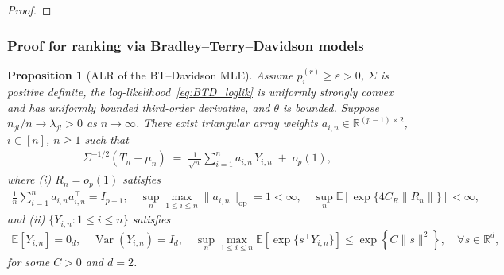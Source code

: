 \documentclass[12pt]{article}
\newcommand{\op}{\mathrm{op}}
\newtheorem{proposition}{Proposition}[section]
\newcommand{\Var}{\operatorname{Var}}
\newcommand{\real}{\mathbb{R}}
\newcommand{\Ee}{{\mathbb{E}}}
\begin{document}
\begin{appendices}
\begin{proof}
\end{proof}


\subsubsection{Proof for ranking via Bradley–Terry–Davidson models}

\begin{proposition}[ALR of the BT--Davidson MLE]
\label{prop:BTD_normal}
Assume $p_i^{(r)}\geq\varepsilon>0$, $\Sigma$ is positive definite, the log-likelihood~\eqref{eq:BTD_loglik} is uniformly strongly convex and has uniformly bounded third-order derivative, and $\theta$ is bounded.
Suppose $n_{jl}/n\to\lambda_{jl}>0$ as
$n\to\infty$. 
There exist triangular array weights
$a_{i,n}\in\mathbb{R}^{(p-1)\times 2}$, $i\in[n]$, $n\geq 1$ such that
\begin{align}
  \Sigma^{-1/2}
  (T_n-\mu_n)
  \;=\;
  \frac{1}{\sqrt{n}}\sum_{i=1}^n a_{i,n}\,Y_{i,n}
  \;+\;o_p(1),
  \label{eq:BTD_ALR}
\end{align}
where (i) $R_n=o_p(1)$ satisfies 
\begin{align*}
  \frac{1}{n}\sum_{i=1}^n a_{i,n}a_{i,n}^{\top}=I_{p-1},
  \quad
  \sup_{n}\max_{1\le i\le n}\|a_{i,n}\|_{\op} = 1 < \infty,
  \quad
  \sup_n\Ee\left[\exp\{4C_R\|R_n\|\}\right] <\infty,
\end{align*}
and (ii) $\{Y_{i,n}:1\le i\le n\}$ satisfies
\begin{align*}
  \Ee[Y_{i,n}]=0_d,
  \quad
  \Var(Y_{i,n})=I_d,
  \quad
  \sup_{n}\max_{1\le i\le n}
  \Ee[\exp\{s^\top Y_{i,n}\}]
  \le
  \exp\left\{C\|s\|^2\right\},
  \quad
  \forall s\in\real^d,
\end{align*}
for some $C > 0$ and $d = 2$.

\end{proposition}






\end{appendices}
\end{document}
